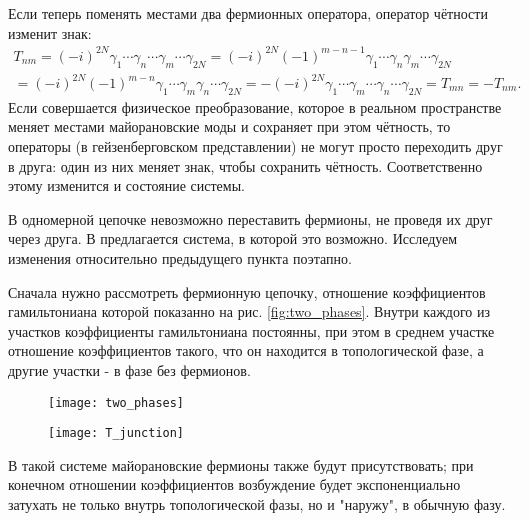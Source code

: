 \documentclass[a4paper,12pt]{article}
\theoremstyle{plain} %
\theoremstyle{definition} %
\theoremstyle{remark} %
\begin{document}
Если теперь поменять местами два фермионных оператора, оператор чётности изменит знак:
\begin{multline}
T_{nm} = (-i)^{2N} \gamma_1 \dotsm \gamma_n \dotsm \gamma_m \dotsm \gamma_{2N} = 
    (-i)^{2N} (-1)^{m-n-1} \gamma_1 \dotsm \gamma_n \gamma_m \dotsm \gamma_{2N} \\ =
    (-i)^{2N} (-1)^{m-n} \gamma_1 \dotsm \gamma_m \gamma_n \dotsm \gamma_{2N} = 
     - (-i)^{2N} \gamma_1 \dotsm \gamma_m \dotsm \gamma_n \dotsm \gamma_{2N} = 
     T_{mn} = - T_{nm}.
\end{multline}
Если совершается физическое преобразование, которое в реальном пространстве меняет местами майорановские моды и сохраняет при этом чётность, то операторы (в гейзенберговском представлении) не могут просто переходить друг в друга: один из них меняет знак, чтобы сохранить чётность. Соответственно этому изменится и состояние системы.

В одномерной цепочке невозможно переставить фермионы, не проведя их друг через друга. В \cite{braiding} предлагается система, в которой это возможно. Исследуем изменения относительно предыдущего пункта поэтапно.

Сначала нужно рассмотреть фермионную цепочку, отношение коэффициентов гамильтониана которой показанно на рис. \ref{fig:two_phases}. Внутри каждого из участков коэффициенты гамильтониана постоянны, при этом в среднем участке отношение коэффициентов такого, что он находится в топологической фазе, а другие участки - в фазе без фермионов.

\begin{figure}
    \centering
    \begin{minipage}{.5\textwidth}
        \centering
        \texttt{[image: two\_phases]}
        \captionsetup{width=0.9\textwidth}
        \label{fig:two_phases}
    \end{minipage}%
    \begin{minipage}{.5\textwidth}
        \centering
        \texttt{[image: T\_junction]}
        \captionsetup{width=0.9\textwidth}
        \label{fig:t_junction}
    \end{minipage}
\end{figure}

В такой системе майорановские фермионы также будут присутствовать; при конечном отношении коэффициентов возбуждение будет экспоненциально затухать не только внутрь топологической фазы, но и "наружу"$ $, в обычную фазу.
\end{document}
